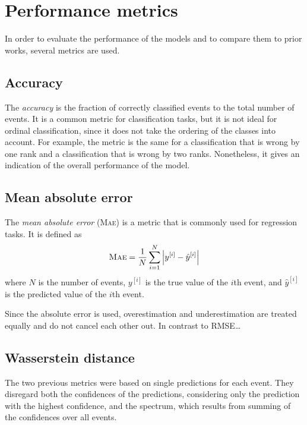 \section{Performance metrics}
\label{sec:metrics} %

In order to evaluate the performance of the models
and to compare them to prior works,
several metrics are used.


\subsection{Accuracy}
The \emph{accuracy} is the fraction of correctly classified events to the total number of events.
It is a common metric for classification tasks,
but it is not ideal for ordinal classification,
  since it does not take the ordering of the classes into account.
For example,
the metric is the same for
a classification that is wrong by one rank
and a classification that is wrong by two ranks.
%
Nonetheless,
it gives an indication of the overall performance of the model.


\subsection{Mean absolute error}
The \emph{mean absolute error} (\textsc{Mae}) is a metric that is commonly used for regression tasks. %
It is defined as
\begin{equation}
  \text{\textsc{Mae}} = \frac{1}{N} \sum_{i=1}^N \left| y^{[i]} - \hat{y}^{[i]} \right|
\end{equation}
where $N$ is the number of events,
$y^{[i]}$ is the true value of the $i$th event,
and $\hat{y}^{[i]}$ is the predicted value of the $i$th event. %


Since the absolute error is used,
overestimation and underestimation are treated equally
and do not cancel each other out.
In contrast to RMSE… %


\subsection{Wasserstein distance}
The two previous metrics were based on single predictions for each event.
They disregard both
  the confidences of the predictions,
    considering only the prediction with the highest confidence,
  and the spectrum,
    which results from summing of the confidences over all events.

